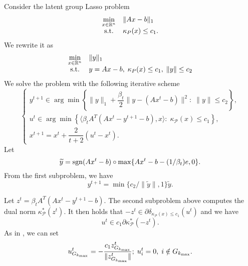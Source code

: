 \documentclass{article}
\numberwithin{equation}{section}
\begin{document}
Consider the latent group Lasso problem
\begin{equation}
	\begin{array}{cl}
	\min\limits_{x\in \mathbb{R}^n} & \|Ax-b\|_1\\
	{\rm s.t.} & \kappa_P(x)\le c_1.
	\end{array}
\end{equation}
We rewrite it as 
\begin{equation}
\begin{array}{cl}
\min\limits_{x\in \mathbb{R}^n} & \|y\|_1\\
{\rm s.t.} & y = Ax-b, \; \kappa_P(x)\le c_1, \; \|y\|\le c_2
\end{array}
\end{equation}
We solve the problem with the following iterative scheme
\begin{equation}
	\left\{
	\begin{array}{l}
	y^{t+1} \in \arg\min \left\{\|y\|_1 +\dfrac{\beta_t}{2}\|y-(Ax^t-b)\|^2:\; \|y\|\le c_2 \right\},\\
	u^t \in \arg\min \left\{\langle\beta_tA^T(Ax^t-y^{t+1}-b), x\rangle :\;\kappa_{\mathcal{P}}(x)\le c_1 \right\},\\
	x^{t+1} = x^t+\dfrac{2}{t+2}(u^t-x^t).
	\end{array}
	\right.
\end{equation}
Let 
\[
\widetilde{y} = {\rm sgn}(Ax^t-b)\circ\max\{Ax^t-b - (1/{\beta_t})e, 0\}.
\]
From the first subproblem, we have
\[
y^{t+1} = \min\{c_2/\|\widetilde y\|, 1\}\widetilde{y}.
\]

Let $ z^t = \beta_tA^T(Ax^t-y^{t+1}-b) $. The second subproblem above computes the dual norm $ \kappa^*_{\mathcal{P}}(z^t) $. It then holds that $ -z^t\in \partial \delta_{\kappa_{\mathcal{P}}(x)\le c_1}(u^t)  $ and we have
\[
u^t\in c_1\partial \kappa^*_{\mathcal{P}}(-z^t).
\] 
As in \cite[Section~3.1]{rao2013conditional}, we can set
\[
u^t_{G_{k_{\rm max}}}=-\dfrac{c_1z^t_{G_{k_{\rm max}}}}{\|z^t_{G_{k_{\rm max}}}\|}; \; u^t_i = 0, \; i\notin G_{k_{\rm max}}.
\]
\end{document}
